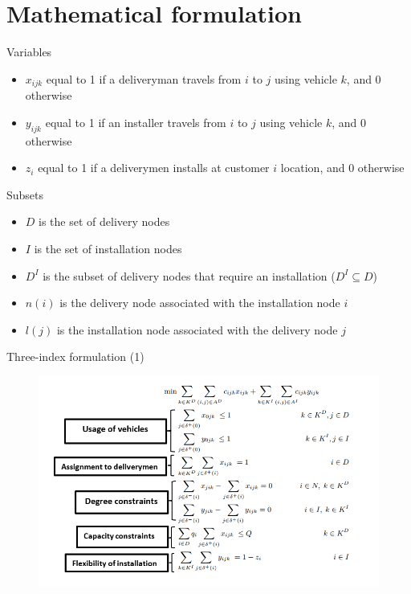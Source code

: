 \documentclass[9pt,xcolor={dvipsnames}]{beamer}
\begin{document}
\section{Mathematical formulation}
\begin{frame}{}

\begin{block}{Variables}
		\begin{itemize}
	 		\item $x_{ijk}$  equal to 1 if a deliveryman travels from $i$ to $j$ using vehicle $k$, and 0 otherwise
	 		\item $y_{ijk}$ equal to 1 if an installer travels from $i$ to $j$ using vehicle $k$, and 0 otherwise 
	  		\item $z_{i}$ equal to 1 if a deliverymen installs at customer $i$ location, and 0 otherwise
	  	\end{itemize}
	\end{block}

	\begin{block}{Subsets}
		\begin{itemize}
	 		\item $D$ is the set of delivery nodes
	 		\item $I$ is the set of installation nodes
	 		\item  $D^I$ is the subset of delivery nodes that require an installation ($D^I \subseteq D$)
	  		\item $n(i)$ is the delivery node associated with the  installation node $i$
	  		\item  $l(j)$ is the installation node associated with the delivery node $j$
  		\end{itemize}
	\end{block}
	
\end{frame}
\begin{frame}[shrink=20]{Three-index formulation (1)}
\begin{figure}[]
 \includegraphics[scale=0.9]{equation1.PNG}
\end{figure}
\end{frame}
\end{document}
